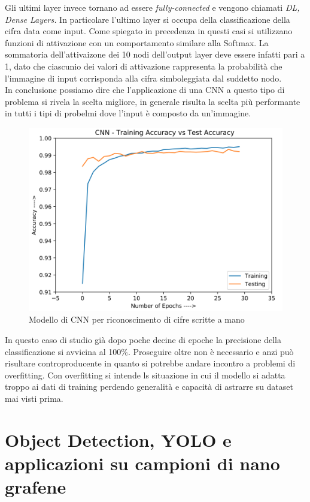 \documentclass[12pt,a4paper,openright,twoside]{report}
\begin{document}
Gli ultimi layer invece tornano ad essere \emph{fully-connected} e vengono chiamati \emph{DL, Dense Layers.}
In particolare l'ultimo layer si occupa della classificazione della cifra data come input. Come spiegato in precedenza in questi casi si utilizzano funzioni di attivazione con un comportamento similare alla Softmax. La sommatoria dell'attivaizone dei 10 nodi dell'output layer deve essere infatti pari a 1, dato che ciascunio dei valori di attivazione rappresenta la probabilità che l'immagine di input corrisponda alla cifra simboleggiata dal suddetto nodo.\\
\newpage
In conclusione possiamo dire che l'applicazione di una CNN a questo tipo di problema si rivela la scelta migliore, in generale risulta la scelta più performante in tutti i tipi di probelmi dove l'input è composto da un'immagine.\\
\begin{figure}[h]
\centering
\includegraphics[width=\linewidth]{cnn_perf.png}
\caption{Modello di CNN per riconoscimento di cifre scritte a mano}
\end{figure}
In questo caso di studio già dopo poche decine di epoche la precisione della classificazione si avvicina al 100\%.
Proseguire oltre non è necessario e anzi può risultare controproducente in quanto si potrebbe andare incontro a problemi di overfitting.
Con overfitting si intende ls situazione in cui il modello si adatta troppo ai dati di training perdendo generalità e capacità di astrarre su dataset mai visti prima. \\

{\let\clearpage\relax \chapter{Object Detection, YOLO e applicazioni su campioni di nano grafene}}
\end{document}
